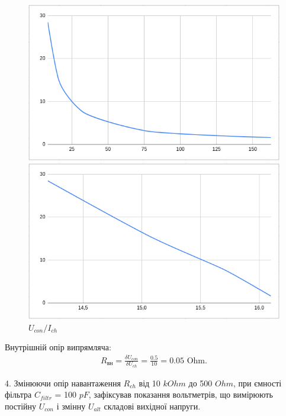 \documentclass{article}
\begin{document}
\begin{normalsize}
	\begin{figure}[H]
		\begin{minipage}[t]{0.48\textwidth}
			\centering
			\includegraphics[width=\textwidth]{g1}
			\caption{$K_\text{п}/I_{ch}$}
		\end{minipage}
		\hfill
		\begin{minipage}[t]{0.48\textwidth}
			\centering
			\includegraphics[width=\textwidth]{g2}
			\caption{$U_{con}/I_{ch}$}
		\end{minipage}
	\end{figure}

	Внутрішній опір	випрямляча:
	\begin{gather}
		R_{вн}=\frac{\delta U_{con}}{\delta U_{ch}}=\frac{0.5}{10}=0.05 \text { Ohm}.\nonumber
	\end{gather}

	4. Змінюючи опір навантаження $R_{ch}$ від 10 $kOhm$ до 500 $Ohm$, при ємності фільтра $C_{filtr}$ = 100 $pF$, зафіксував показання вольтметрів, що вимірюють постійну $U_{con}$ і змінну $U_{alt}$ складові вихідної напруги.


\end{normalsize}
\end{document}
